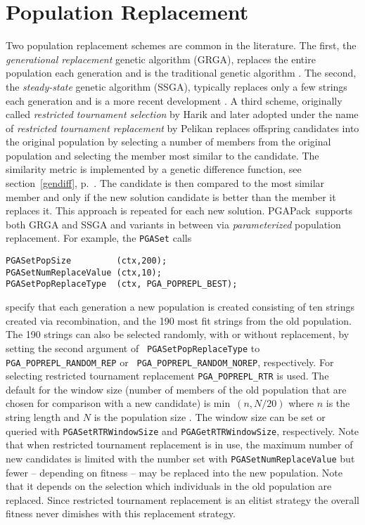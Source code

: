 \documentclass{report}
\newcommand{\pga}{PGAPack}
\begin{document}
\section{Population Replacement}\label{sec:population-replacement}
Two population replacement schemes are common in the literature.  The first,
the {\em generational replacement} genetic algorithm (GRGA), replaces the
entire population each generation and is the traditional genetic algorithm
\cite{Ho92}.  The second, the {\em steady-state} genetic algorithm (SSGA),
typically replaces only a few strings each generation and is a more recent
development
\cite{Sy89,Wh89,WhKa88}.
A third scheme, originally called \textit{restricted tournament
selection} by Harik \cite{Har94,Har95} and later adopted under the name of
\textit{restricted tournament replacement} by Pelikan \cite{Pel05}
replaces offspring candidates into the original population by selecting
a number of members from the original population and selecting the
member most similar to the candidate. The similarity metric is
implemented by a genetic difference function, see
section~\ref{gendiff}, p.~\pageref{gendiff}.
The candidate is then compared to the most similar member and only if
the new solution candidate is better than the member it replaces it.
This approach is repeated for each new solution.
\pga\ supports both GRGA and SSGA and variants in between via {\em
parameterized} population replacement.  For example, the {\tt PGASet} calls
\begin{verbatim}
PGASetPopSize         (ctx,200);
PGASetNumReplaceValue (ctx,10);
PGASetPopReplaceType  (ctx, PGA_POPREPL_BEST);
\end{verbatim}
specify that each generation a new population is created consisting of ten
strings created via recombination, and the 190 most fit strings from the old
population.  The 190 strings can also be selected
randomly, with or without replacement, by setting the second argument of {\tt
PGASetPopReplaceType} to {\tt PGA\_POPREPL\_RANDOM\_REP} or {\tt
PGA\_POPREPL\_RANDOM\_NOREP}, respectively. For selecting restricted
tournament replacement \verb+PGA_POPREPL_RTR+ is used. The default for
the window size (number of members of the old population that are chosen
for comparison with a new candidate) is \hbox{min $(n, N/20)$} where $n$
is the string length and $N$ is the population size \cite{Pel05}.
The window size can be set or queried
with \verb+PGASetRTRWindowSize+ and \verb+PGAGetRTRWindowSize+,
respectively. Note that when restricted tournament replacement is in
use, the maximum number of new candidates is limited with the number set
with \verb+PGASetNumReplaceValue+ but fewer -- depending on fitness --
may be replaced into the new population. Note that it depends on the
selection which individuals in the old population are replaced. Since
restricted tournament replacement is an elitist strategy the overall
fitness never dimishes with this replacement strategy.
\end{document}
